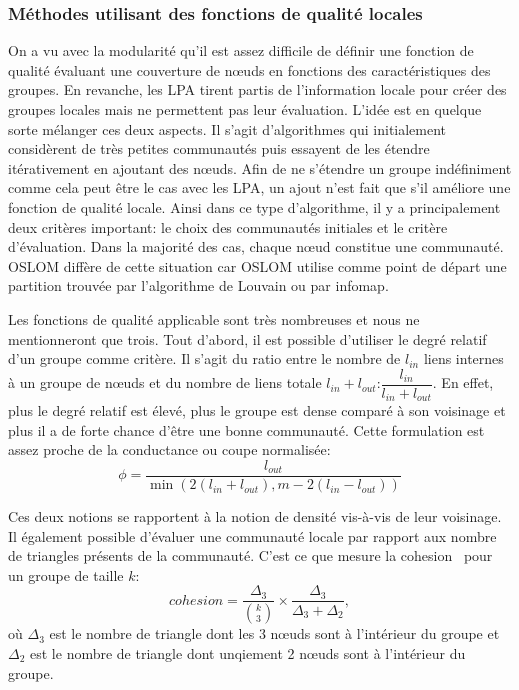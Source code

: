\subsubsection{Méthodes utilisant des fonctions de qualité locales}
On a vu avec la modularité qu'il est assez difficile de définir une fonction de qualité évaluant une couverture de n\oe uds en fonctions des caractéristiques des groupes.
En revanche, les LPA tirent partis de l'information locale pour créer des groupes locales mais ne permettent pas leur évaluation.
L'idée est en quelque sorte mélanger ces deux aspects.
Il s'agit d'algorithmes qui initialement considèrent de très petites communautés puis essayent de les étendre itérativement en ajoutant des n\oe uds.
Afin de ne s'étendre un groupe indéfiniment comme cela peut être le cas avec les LPA, un ajout n'est fait que s'il améliore une fonction de qualité locale.
Ainsi dans ce type d'algorithme, il y a principalement deux critères important:
le choix des communautés initiales et le critère d'évaluation.
Dans la majorité des cas, chaque n\oe ud constitue une communauté. 
OSLOM\cite{Lancichinetti2011a} diffère de cette situation car OSLOM utilise comme point de départ une partition trouvée par l'algorithme de Louvain ou par infomap.

Les fonctions de qualité applicable sont très nombreuses et nous ne mentionneront que trois.
Tout d'abord, il est possible d'utiliser le degré relatif~\cite{Luo2008} d'un groupe comme critère.
Il s'agit du ratio entre le nombre de $l_{in}$ liens internes à un groupe de n\oe uds et du nombre de liens totale $l_{in}+l_{out}$:$ \dfrac{l_{in}}{l_{in}+l_{out}}$.
En effet, plus le degré relatif est élevé, plus le groupe est dense comparé à son voisinage et plus il a de forte chance d'être une bonne communauté. 
Cette formulation est assez proche de la conductance ou coupe normalisée\cite{Shi2000}:
\begin{equation}
\phi =\dfrac{l_{out}}{\min \left( 2(l_{in}+l_{out}),m-2(l_{in}-l_{out}) \right) }
\end{equation}

Ces deux notions se rapportent à la notion de densité vis-à-vis de leur voisinage.
Il également possible d'évaluer une communauté locale par rapport aux nombre de triangles présents de la communauté.
C'est ce que mesure la cohesion~\cite{Friggeri2011} pour un groupe de taille $k$: 
\begin{equation}
cohesion=\dfrac{\Delta_3}{ {k \choose 3} } \times \frac{\Delta_3}{\Delta_3+\Delta_2},
\end{equation}
où $\Delta_3$ est le nombre de triangle dont les 3 n\oe uds sont à l'intérieur du groupe et $\Delta_2$ est le nombre de triangle dont unqiement 2 n\oe uds sont à l'intérieur du groupe.

